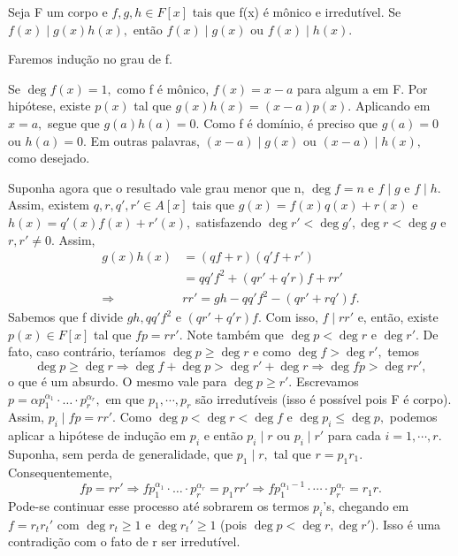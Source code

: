 \documentclass[algebraII_notes.tex]{subfiles}
\begin{document}
\begin{crl*}
	Seja F um corpo e \(f, g, h\in F[x]\) tais que f(x) é mônico e irredutível.
	Se \(f(x)\mid g(x)h(x),\) então \(f(x)\mid g(x)\) ou \(f(x)\mid h(x).\)
\end{crl*}
\begin{proof*}
	Faremos indução no grau de f.

	Se \(\deg{f(x)} = 1,\) como f é mônico, \(f(x) = x-a\) para algum a em F. Por hipótese, existe \(p(x)\) tal que
	\(g(x)h(x) = (x-a)p(x).\) Aplicando em \(x=a,\) segue que \(g(a)h(a) = 0.\) Como f é domínio, é preciso que
	\(g(a) = 0\) ou \(h(a) = 0\). Em outras palavras, \((x-a)\mid g(x)\) ou \((x-a)\mid h(x),\) como desejado.

	Suponha agora que o resultado vale grau menor que n, \(\deg{f} = n\) e \(f\mid g\) e \(f\mid h.\) Assim, existem
	\(q, r, q', r'\in A[x]\) tais que \(g(x) = f(x)q(x) + r(x)\) e \(h(x) = q'(x)f(x) + r'(x),\) satisfazendo
	\(\deg{r'} < \deg{g'}, \deg{r} < \deg{g}\) e \(r, r'\neq 0.\) Assim,
	\begin{align*}
		g(x)h(x)    & = (qf + r)(q'f + r')                \\
		            & = qq'f^{2} + (qr' + q'r)f + rr'     \\
		\Rightarrow & rr' = gh - qq'f^{2} - (qr' + rq')f.
	\end{align*}
	Sabemos que f divide \(gh, qq'f^{2}\) e \((qr' + q'r)f.\) Com isso, \(f\mid rr'\) e, então,
	existe \(p(x)\in F[x]\) tal que \(fp = rr'.\) Note também que \(\deg{p} < \deg{r} \) e \(\deg{r'}.\) De fato,
	caso contrário, teríamos \(\deg{p}\geq \deg{r}\) e como \(\deg{f} > \deg{r'},\) temos
	\[
		\deg{p}\geq \deg{r} \Rightarrow \deg{f} + \deg{p} > \deg{r'} + \deg{r} \Rightarrow \deg{fp} > \deg{rr'},
	\]
	o que é um absurdo. O mesmo vale para \(\deg{p}\geq r'.\) Escrevamos \(p = \alpha p_{1}^{\alpha_{1}}\cdot \dotsc \cdot p_{r}^{\alpha_{r}},\)
	em que \(p_{1}, \cdots, p_{r}\) são irredutíveis (isso é possível pois F é corpo). Assim, \(p_{i}\mid fp = rr'.\)
	Como \(\deg{p} < \deg{r} < \deg{f}\) e \(\deg{p_{i}}\leq \deg{p},\) podemos aplicar a hipótese de indução em \(p_{i}\) e então
	\(p_{i}\mid r\) ou \(p_{i}\mid r'\) para cada \(i=1, \cdots, r\). Suponha, sem perda de generalidade, que \(p_{1}\mid r,\) tal que
	\(r=p_{1}r_{1}\). Consequentemente,
	\[
		fp = rr' \Rightarrow fp_{1}^{\alpha_{1}}\cdot \dotsc \cdot p_{r}^{\alpha_{r}} = p_{1}rr' \Rightarrow fp_{1}^{\alpha_{1} -1}\cdot \cdots \cdot p_{r}^{\alpha_{r}} = r_{1}r.
	\]
	Pode-se continuar esse processo até sobrarem os termos \(p_{i}\)'s, chegando em
	\(f = r_{t}r_{t}'\) com \(\deg{r_{t}}\geq 1\) e \(\deg{r_{t}'}\geq 1\) (pois \(\deg{p} < \deg{r}, \deg{r'}\)). Isso é uma contradição
	com o fato de r ser irredutível.
\end{proof*}
\end{document}
